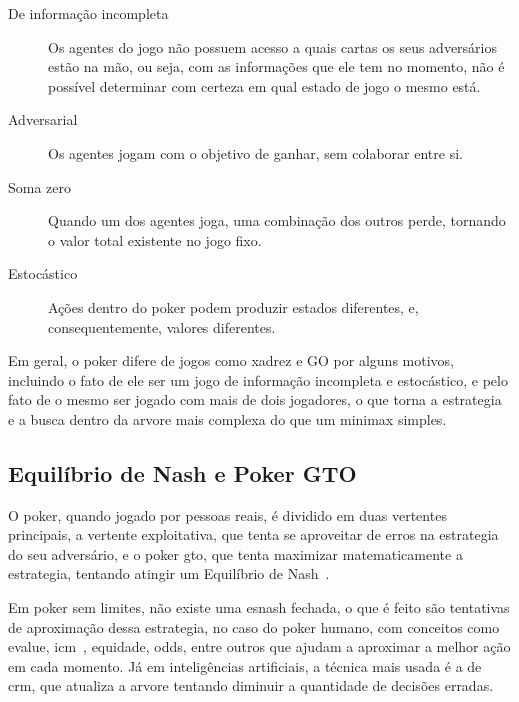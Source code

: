 \documentclass[twocolumn]{article}
\theoremstyle{mytheoremstyle}
\theoremstyle{mytheoremstyle}
\theoremstyle{myproblemstyle}
\begin{document}
        \begin{description}
            \item[De informação incompleta] Os agentes do jogo não possuem acesso a quais cartas os seus adversários estão na mão, ou seja,
                com as informações que ele tem no momento, não é possível determinar com certeza em qual estado de jogo o mesmo está.

            \item[Adversarial] Os agentes jogam com o objetivo de ganhar, sem colaborar entre si.

            \item[Soma zero] Quando um dos agentes joga, uma combinação dos outros perde, tornando o valor total existente no jogo fixo.

            \item[Estocástico] Ações dentro do poker podem produzir estados diferentes, e, consequentemente, valores diferentes.
        \end{description}

        Em geral, o poker difere de jogos como xadrez e GO por alguns motivos, incluindo o fato de ele ser um jogo de informação incompleta
        e estocástico, e pelo fato de o mesmo ser jogado com mais de dois jogadores, o que torna a \gls{estrategia} e a busca dentro da \gls{arvore}
        mais complexa do que um minimax simples.

        \subsection{Equilíbrio de Nash e Poker GTO} %
        \label{ssub:Equilíbrio de Nash e Poker GTO}
            O poker, quando jogado por pessoas reais, é dividido em duas vertentes principais, a vertente exploitativa, que tenta se aproveitar
            de erros na \gls{estrategia} do seu adversário, e o poker \acrfull{gto}, que tenta maximizar matematicamente a \gls{estrategia},
            tentando atingir um Equilíbrio de Nash~\cite{nash1950equilibrium}.

            Em poker sem limites, não existe uma \gls{esnash} fechada, o que é feito são tentativas de aproximação dessa \gls{estrategia},
            no caso do poker humano, com conceitos como \gls{evalue}, \gls{icm}~\cite{gilbert2009independent}, \gls{equidade},
            \gls{odds}, entre outros
            que ajudam a aproximar a melhor ação em cada momento. Já em inteligências artificiais, a técnica mais usada é a de \acrfull{crm}, que atualiza a \gls{arvore} tentando diminuir a quantidade de decisões erradas.
\end{document}
